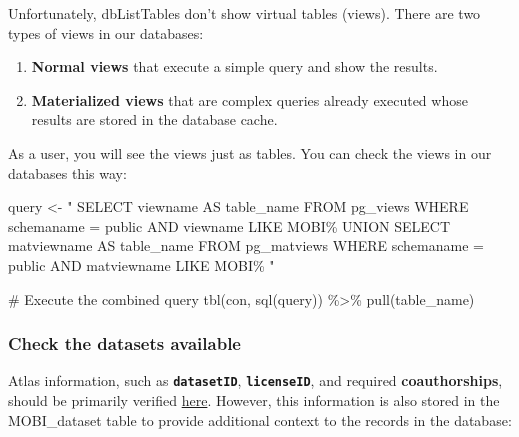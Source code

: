 \documentclass[
  letterpaper,
  DIV=11,
  numbers=noendperiod]{scrartcl}
\newenvironment{Shaded}{\begin{snugshade}}{\end{snugshade}}
\newcommand{\CommentTok}[1]{\textcolor[rgb]{0.37,0.37,0.37}{#1}}
\newcommand{\FunctionTok}[1]{\textcolor[rgb]{0.28,0.35,0.67}{#1}}
\newcommand{\NormalTok}[1]{\textcolor[rgb]{0.00,0.23,0.31}{#1}}
\newcommand{\OtherTok}[1]{\textcolor[rgb]{0.00,0.23,0.31}{#1}}
\newcommand{\SpecialCharTok}[1]{\textcolor[rgb]{0.37,0.37,0.37}{#1}}
\newcommand{\StringTok}[1]{\textcolor[rgb]{0.13,0.47,0.30}{#1}}
\begin{document}
Unfortunately, dbListTables don't show virtual tables (views). There are
two types of views in our databases:

\begin{enumerate}
\def\labelenumi{\arabic{enumi}.}
\item
  \textbf{Normal views} that execute a simple query and show the
  results.
\item
  \textbf{Materialized views} that are complex queries already executed
  whose results are stored in the database cache.
\end{enumerate}

As a user, you will see the views just as tables. You can check the
views in our databases this way:

\begin{Shaded}
\begin{Highlighting}[]
\NormalTok{query }\OtherTok{\textless{}{-}} \StringTok{"}
\StringTok{  SELECT viewname AS table\_name}
\StringTok{  FROM pg\_views}
\StringTok{  WHERE schemaname = \textquotesingle{}public\textquotesingle{} AND viewname LIKE \textquotesingle{}MOBI\%\textquotesingle{}}
\StringTok{  UNION}
\StringTok{  SELECT matviewname AS table\_name}
\StringTok{  FROM pg\_matviews}
\StringTok{  WHERE schemaname = \textquotesingle{}public\textquotesingle{} AND matviewname LIKE \textquotesingle{}MOBI\%\textquotesingle{}}
\StringTok{"}

\CommentTok{\# Execute the combined query}
\FunctionTok{tbl}\NormalTok{(con, }\FunctionTok{sql}\NormalTok{(query)) }\SpecialCharTok{\%\textgreater{}\%}
  \FunctionTok{pull}\NormalTok{(table\_name)}
\end{Highlighting}
\end{Shaded}

\subsubsection{Check the datasets
available}\label{check-the-datasets-available}

Atlas information, such as \textbf{\texttt{datasetID}},
\textbf{\texttt{licenseID}}, and required \textbf{coauthorships}, should
be primarily verified
\href{https://teams.microsoft.com/l/entity/1c256a65-83a6-4b5c-9ccf-78f8afb6f1e8/_djb2_msteams_prefix_3860493077?context=\%7B\%22channelId\%22\%3A\%2219\%3A83f73536d2d1486796ec7d176d35e415\%40thread.tacv2\%22\%7D&tenantId=f26a48e1-fc21-461a-b97f-ac5bd535f341}{here}.
However, this information is also stored in the MOBI\_dataset table to
provide additional context to the records in the database:
\end{document}
